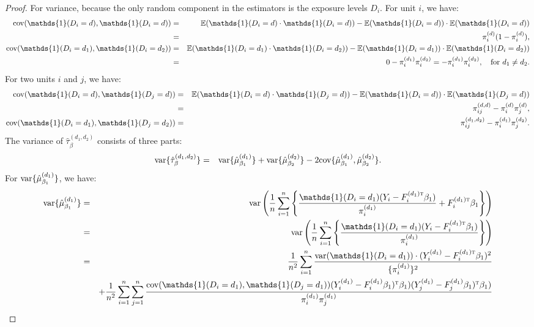 \documentclass[twoside,letterpaper]{article}
\newcommand{\mathbbm}[1]{\mathds{#1}}
\theoremstyle{plain}
\theoremstyle{definition}
\theoremstyle{remark}
\newcommand{\E}{\mathbb{E}}
\def\T{{\textsc{t}}}
\newcommand{\cov}{\textup{cov}}
\newcommand{\var}{\textup{var}}
\newcommand{\indicator}{\mathbbm{1}}
\newcommand{\sumi}{\sum_{i=1}^n}
\newcommand{\sumij}{\sum_{i=1}^{n} \sum_{j=1}^{n}}
\begin{document}
\begin{proof}
    For variance, because the only random component in the estimators is the exposure levels $D_i$. For unit $i$, we have:
    \begin{eqnarray*}
        \cov(\indicator(D_i=d), \indicator(D_i=d)) &=& \E(\indicator(D_i=d) \cdot \indicator(D_i=d)) - \E(\indicator(D_i=d)) \cdot \E(\indicator(D_i=d)) \\
        &=& \pi_i^{(d)}(1 - \pi_i^{(d)}), \\
        \cov(\indicator(D_i=d_1), \indicator(D_i=d_2)) &=& \E(\indicator(D_i=d_1) \cdot \indicator(D_i=d_2)) - \E(\indicator(D_i=d_1)) \cdot \E(\indicator(D_i=d_2)) \\
        &=& 0 - \pi_i^{(d_1)}\pi_i^{(d_2)} = - \pi_i^{(d_1)}\pi_i^{(d_2)}, \quad \text{for } d_1\neq d_2.   
    \end{eqnarray*}    
    For two units $i$ and $j$, we have:
    \begin{eqnarray*}
        \cov(\indicator(D_i=d), \indicator(D_j=d)) &=& \E(\indicator(D_i=d) \cdot \indicator(D_j=d)) - \E(\indicator(D_i=d)) \cdot \E(\indicator(D_j=d)) \\
        &=& \pi_{ij}^{(d,d)} - \pi_i^{(d)}\pi_j^{(d)}, \\
        \cov(\indicator(D_i=d_1), \indicator(D_j=d_2)) &=& \pi_{ij}^{(d_1,d_2)} - \pi_i^{(d_1)}\pi_j^{(d_2)} . 
    \end{eqnarray*}    
    The variance of $\hat\tau^{(d_1, d_2)}_{\beta}$ consists of three parts:
    \begin{eqnarray*}
        \var\{\hat\tau^{(d_1, d_2)}_{\beta}\} &=& \var\{\hat\mu^{(d_1)}_{\beta_1}\} + \var\{\hat\mu^{(d_2)}_{\beta_2}\} - 2\cov\{\hat\mu^{(d_1)}_{\beta_1}, \hat\mu^{(d_2)}_{\beta_2}\}.
    \end{eqnarray*}
    For $\var\{\hat\mu^{(d_1)}_{\beta_1}\}$, we have:
    \begin{eqnarray*}
        \var\{\hat\mu^{(d_1)}_{\beta_1}\} &=& \var\left(\frac{1}{n}\sumi \left\{ \frac{\indicator(D_i=d_1)(Y_i-F_i^{(d_1)\T} \beta_1)}{\pi_i^{(d_1)}} + F_i^{(d_1)\T}\beta_1 \right\}\right) \\
        &=& \var\left(\frac{1}{n}\sumi \left\{ \frac{\indicator(D_i=d_1)(Y_i-F_i^{(d_1)\T} \beta_1)}{\pi_i^{(d_1)}} \right\}\right)\\
        &=& \frac{1}{n^2} \sumi \frac{\var(\indicator(D_i = d_1)) \cdot (Y_i^{(d_1)} - F_i^{(d_1)\T}\beta_1)^2}{\{\pi_i^{(d_1)}\}^2}\\
        &&  + \frac{1}{n^2} \sumij \frac{\cov(\indicator(D_i=d_1), \indicator(D_j=d_1)) (Y_i^{(d_1)} - F_i^{(d_1)}\beta_1)^{\T} \beta_1)(Y_j^{(d_1)} - F_j^{(d_1)}\beta_1)^{\T} \beta_1)}{\pi_i^{(d_1)}\pi_j^{(d_1)}} \\

\end{eqnarray*}
\end{proof}
\end{document}
